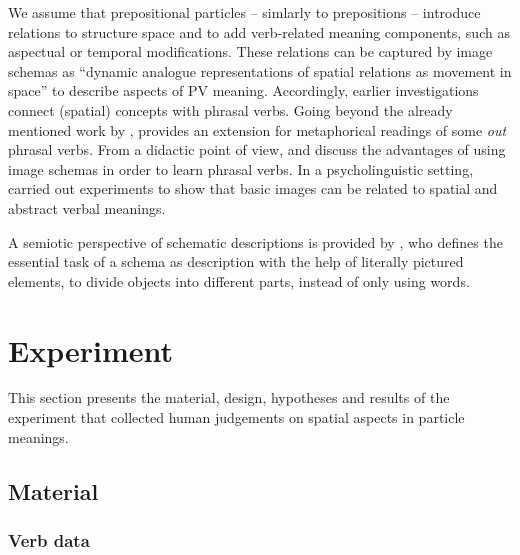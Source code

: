 \documentclass[output=paper]{langsci/langscibook}
\begin{document}
We assume that prepositional particles -- simlarly to prepositions --
introduce relations to structure space and to add verb-related meaning
components, such as aspectual or temporal modifications. These
relations can be captured by image schemas as ``dynamic analogue
representations of spatial relations as movement in space''
\citep{Gibbs/Colston:95} to describe aspects of PV
meaning. Accordingly, earlier investigations connect (spatial)
concepts with phrasal verbs. Going beyond the already mentioned work
by \cite{Lindner:83}, \cite{Morgan:97} provides an extension for
metaphorical readings of some \textit{out} phrasal verbs. From a
didactic point of view, \cite{Side:90} and \cite{Abreu/Vieira:08}
discuss the advantages of using image schemas in order to learn
phrasal verbs. In a psycholinguistic setting, \cite{RichardsonEtAl:01}
carried out experiments to show that basic images can be related to
spatial and abstract verbal meanings.

A semiotic perspective of schematic descriptions is provided by
\cite{Frutiger:87}, who defines the essential task of a schema as
description with the help of literally pictured elements, to divide
objects into different parts, instead of only using
words.


\section{Experiment}
\label{sec:exp}

This section presents the material, design, hypotheses and results of
the experiment that collected human judgements on spatial aspects in
particle meanings.

\subsection{Material}

\subsubsection{Verb data}
\label{sec:data}
\end{document}

